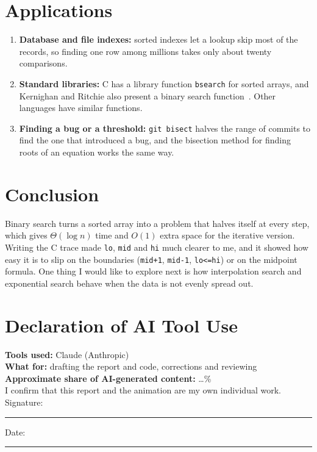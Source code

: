 \documentclass[11pt,a4paper]{article}
\begin{document}
\section{Applications}
\begin{enumerate}
\item \textbf{Database and file indexes:} sorted indexes let a lookup skip most of
the records, so finding one row among millions takes only about twenty
comparisons.
\item \textbf{Standard libraries:} C has a library function \texttt{bsearch} for
sorted arrays, and Kernighan and Ritchie also present a binary search
function~\cite{kr1988}. Other languages have similar functions.
\item \textbf{Finding a bug or a threshold:} \texttt{git bisect} halves the range
of commits to find the one that introduced a bug, and the bisection method for
finding roots of an equation works the same way.
\end{enumerate}

\section{Conclusion}
Binary search turns a sorted array into a problem that halves itself at every
step, which gives $\Theta(\log n)$ time and $O(1)$ extra space for the iterative
version. Writing the C trace made \texttt{lo}, \texttt{mid} and \texttt{hi} much
clearer to me, and it showed how easy it is to slip on the boundaries
(\texttt{mid+1}, \texttt{mid-1}, \texttt{lo<=hi}) or on the midpoint formula. One
thing I would like to explore next is how interpolation search and exponential
search behave when the data is not evenly spread out.

\section*{Declaration of AI Tool Use}
\noindent\textbf{Tools used:} Claude (Anthropic)\\
\textbf{What for:} drafting the report and code, corrections and reviewing\\
\textbf{Approximate share of AI-generated content:} \dots\%\\[6pt]
I confirm that this report and the animation are my own individual work.\\[14pt]
Signature: \rule{4cm}{0.4pt} \hfill Date: \rule{3cm}{0.4pt}



\end{document}
